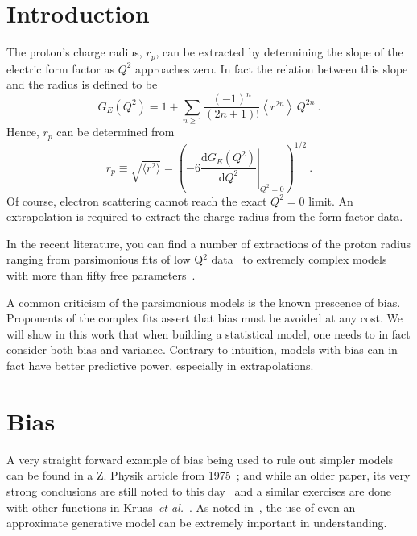 \documentclass[10pt,aps,prc,twocolumn]{revtex4-1}
\begin{document}
\maketitle

\section{Introduction}

The proton's charge radius, $r_p$, can be extracted
by determining the slope of the electric form factor as $Q^2$
approaches zero.  In fact the relation between this slope and 
the radius is defined to be
$$
G_E(Q^2)
   =  1
   +  \sum_{n\ge 1} \frac{(-1)^n}{(2n+1)!}
      \left\langle r^{2n} \right\rangle \, Q^{2n} \>.
$$
Hence, $r_p$ can be determined from
$$
  r_p \equiv \sqrt{ \langle r^2 \rangle}
   = \left( -6  \left. \frac{\mathrm{d} G_E(Q^2)}{\mathrm{d}Q^2}
    \right|_{Q^{2}=0} \right)^{1/2} \>.
 $$
Of course, electron scattering cannot reach the exact $Q^2 = 0$ limit.
An extrapolation is required to extract the charge radius from the form factor data.

In the recent literature, you can find a number of extractions of the proton radius ranging from
parsimonious fits of low Q$^2$ data~\cite{Griffioen:2015hta,Horbatsch:2016ilr,Higinbotham:2015rja} to extremely 
complex models with more than fifty free parameters~\cite{}.

A common criticism of the parsimonious models is the known prescence of bias. 
Proponents of the complex fits assert that bias must be avoided at any cost. 
We will show in this work that when building a statistical model, one needs to in fact consider both bias and variance.
Contrary to intuition, models with bias can in fact have better predictive power, especially in extrapolations.

\section{Bias}

A very straight forward example of bias being used to rule out simpler models can be found in a Z. Physik
article from 1975~\cite{Borkowski:1975}; and while an older paper, its very strong conclusions are still 
noted to this day~\cite{Sick:2017aor} and a similar exercises are done with other functions in Kruas~\textit{et al.}~\cite{Kraus:2014qua}.
As noted in~\cite{Hogg:2010yz}, the use of even an approximate generative model can be extremely important in understanding. %
\end{document}
